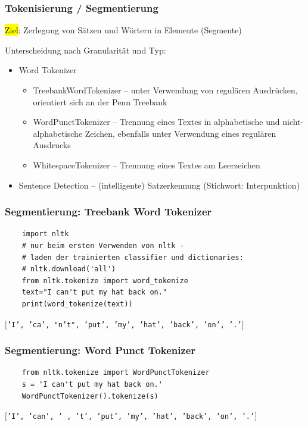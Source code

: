 \begin{frame}
    \frametitle{Tokenisierung / Segmentierung}
    
    \hl{Ziel}: Zerlegung von Sätzen und Wörtern in Elemente (Segmente)

    Unterscheidung nach Granularität und Typ:
    \begin{itemize}
    \item Word Tokenizer
    \begin{itemize}
        \item TreebankWordTokenizer -- unter Verwendung von regulären Ausdrücken, orientiert sich an der Penn Treebank
        \item WordPunctTokenizer -- Trennung eines Textes in alphabetische und nicht-alphabetische Zeichen, ebenfalls unter Verwendung eines regulären Ausdrucks
        \item WhitespaceTokenizer -- Trennung eines Textes am Leerzeichen
    \end{itemize}
    \item Sentence Detection -- (intelligente) Satzerkennung (Stichwort: Interpunktion)
    \end{itemize}
\end{frame}
    
    
\begin{frame}[fragile]
    \frametitle{Segmentierung: Treebank Word Tokenizer}
    
    \begin{verbatim}
    import nltk
    # nur beim ersten Verwenden von nltk -
    # laden der trainierten classifier und dictionaries: 
    # nltk.download('all') 
    from nltk.tokenize import word_tokenize
    text="I can't put my hat back on."
    print(word_tokenize(text))
    \end{verbatim}

    \texttt{$[$'I', 'ca', "n't", 'put', 'my', 'hat', 'back', 'on', '.'$]$}
\end{frame}
    
    
\begin{frame}[fragile]
    \frametitle{Segmentierung: Word Punct Tokenizer}
    
    \begin{verbatim}
    from nltk.tokenize import WordPunctTokenizer 
    s = 'I can't put my hat back on.' 
    WordPunctTokenizer().tokenize(s)
    \end{verbatim}

    \texttt{$[$'I', 'can', \dq ' \dq, 't', 'put', 'my', 'hat', 'back', 'on', '.'$]$}
\end{frame}
    
